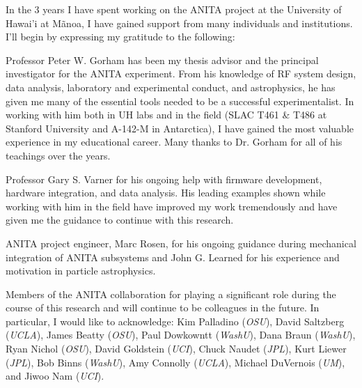 \begin{acknowledgements}
\par In the 3 years I have spent working on the ANITA project at the University of Hawai'i at M\~{a}noa, I have gained support from many individuals and institutions.  I'll begin by expressing my gratitude to the following:

\par Professor Peter W. Gorham has been my thesis advisor and the principal investigator for the ANITA experiment.  From his knowledge of RF system design, data analysis, laboratory and experimental conduct, and astrophysics, he has given me many of the essential tools needed to be a successful experimentalist.  In working with him both in UH labs and in the field (SLAC T461 \& T486 at Stanford University and A-142-M in Antarctica), I have gained the most valuable experience in my educational career.  Many thanks to Dr. Gorham for all of his teachings over the years.

\par Professor Gary S. Varner for his ongoing help with firmware development, hardware integration, and data analysis.  His leading examples shown while working with him in the field have improved my work tremendously and have given me the guidance to continue with this research.

\par ANITA project engineer, Marc Rosen, for his ongoing guidance during mechanical integration of ANITA subsystems and John G. Learned for his experience and motivation in particle astrophysics.

\par Members of the ANITA collaboration for playing a significant role during the course of this research and will continue to be colleagues in the future.  In particular, I would like to acknowledge: Kim Palladino (\textit{OSU}), David Saltzberg (\textit{UCLA}), James Beatty (\textit{OSU}), Paul Dowkowntt (\textit{WashU}), Dana Braun (\textit{WashU}), Ryan Nichol (\textit{OSU}), David Goldstein (\textit{UCI}), Chuck Naudet (\textit{JPL}), Kurt Liewer (\textit{JPL}), Bob Binns (\textit{WashU}), Amy Connolly (\textit{UCLA}), Michael DuVernois (\textit{UM}), and Jiwoo Nam (\textit{UCI}).


\end{acknowledgements}
